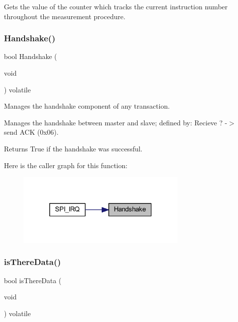 Gets the value of the counter which tracks the current instruction number throughout the measurement procedure. 

\mbox{\label{class_master_a2bc479ad10a53f31c4833668cc9cfac4}} 
\subsubsection{\texorpdfstring{Handshake()}{Handshake()}}
{\footnotesize\ttfamily bool Handshake (\begin{DoxyParamCaption}\item[{void}]{ }\end{DoxyParamCaption}) volatile}



Manages the handshake component of any transaction. 

Manages the handshake between master and slave; defined by\+: Recieve \textquotesingle{}?\textquotesingle{} -\/$>$ send \textquotesingle{}A\+CK\textquotesingle{} (0x06). \begin{DoxyReturn}{Returns}
True if the handshake was successful. 
\end{DoxyReturn}
Here is the caller graph for this function\+:
\nopagebreak
\begin{figure}[H]
\begin{center}
\leavevmode
\includegraphics[width=235pt]{class_master_a2bc479ad10a53f31c4833668cc9cfac4_icgraph}
\end{center}
\end{figure}
\mbox{\label{class_master_a23536349ac40fc9cc030e9bc5d0c5945}} 
\subsubsection{\texorpdfstring{isThereData()}{isThereData()}}
{\footnotesize\ttfamily bool is\+There\+Data (\begin{DoxyParamCaption}\item[{void}]{ }\end{DoxyParamCaption}) volatile}




